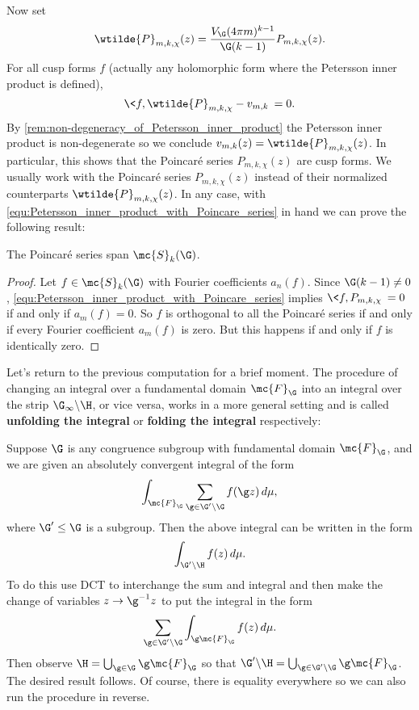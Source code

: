     Now set
    \[
      \wtilde{P}_{m,k,\chi}(z) = \frac{V_{\G}(4\pi m)^{k-1}}{\G(k-1)}P_{m,k,\chi}(z).
    \]
    For all cusp forms $f$ (actually any holomorphic form where the Petersson inner product is defined),
    \[
      \<f,\wtilde{P}_{m,k,\chi}-v_{m,k}\> = 0.
    \]
    By \cref{rem:non-degeneracy_of_Petersson_inner_product} the Petersson inner product is non-degenerate so we conclude $v_{m,k}(z) = \wtilde{P}_{m,k,\chi}(z)$. In particular, this shows that the Poincar\'e series $P_{m,k,\chi}(z)$ are cusp forms. We usually work with the Poincar\'e series $P_{m,k,\chi}(z)$ instead of their normalized counterparts $\wtilde{P}_{m,k,\chi}(z)$. In any case, with \cref{equ:Petersson_inner_product_with_Poincare_series} in hand we can prove the following result:

    \begin{theorem}
      The Poincar\'e series span $\mc{S}_{k}(\G)$.
    \end{theorem}
    \begin{proof}
      Let $f \in \mc{S}_{k}(\G)$ with Fourier coefficients $a_{n}(f)$. Since $\G(k-1) \neq 0$, \cref{equ:Petersson_inner_product_with_Poincare_series} implies $\<f,P_{m,k,\chi}\> = 0$ if and only if $a_{m}(f) = 0$. So $f$ is orthogonal to all the Poincar\'e series if and only if every Fourier coefficient $a_{m}(f)$ is zero. But this happens if and only if $f$ is identically zero.
    \end{proof}

    Let's return to the previous computation for a brief moment. The procedure of changing an integral over a fundamental domain $\mc{F}_{\G}$ into an integral over the strip $\G_{\infty}\backslash\H$, or vice versa, works in a more general setting and is called \textbf{unfolding the integral} or \textbf{folding the integral} respectively:

    \begin{method}
      Suppose $\G$ is any congruence subgroup with fundamental domain $\mc{F}_{\G}$, and we are given an absolutely convergent integral of the form
      \[
        \int_{\mc{F}_{\G}}\sum_{\g \in \G'\backslash\G}f(\g z)\,d\mu,
      \]
      where $\G' \le \G$ is a subgroup. Then the above integral can be written in the form
      \[
        \int_{\G'\backslash\H}f(z)\,d\mu.
      \]
      To do this use DCT to interchange the sum and integral and then make the change of variables $z \to \g^{-1}z$ to put the integral in the form
      \[
        \sum_{\g \in \G'\backslash\G}\int_{\g\mc{F}_{\G}}f(z)\,d\mu.
      \]
      Then observe $\H = \bigcup_{\g \in \G}\g\mc{F}_{\G}$ so that $\G'\backslash\H = \bigcup_{\g \in \G'\backslash\G}\g\mc{F}_{\G}$. The desired result follows. Of course, there is equality everywhere so we can also run the procedure in reverse.
    \end{method}
